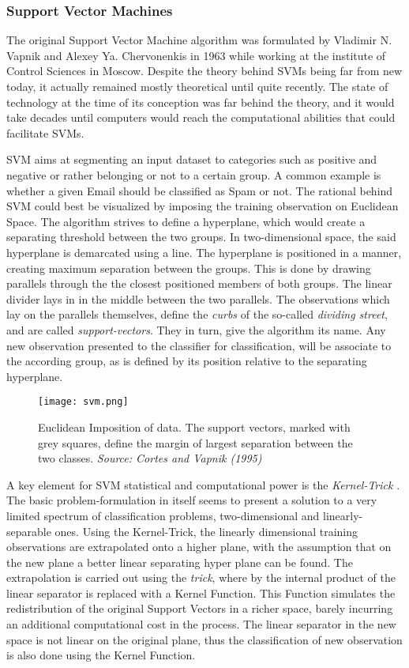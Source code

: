	\subsubsection*{Support Vector Machines}
		The original Support Vector Machine algorithm was formulated by Vladimir N. Vapnik and Alexey Ya. Chervonenkis in 1963 while working at the institute of Control Sciences in Moscow. Despite the theory behind SVMs being far from new today, it actually remained mostly theoretical until quite recently. The state of technology at the time of its conception was far behind the theory, and it would take decades until computers would reach the computational abilities that could facilitate SVMs.
		\par
		SVM aims at segmenting an input dataset to categories such as positive and negative or rather belonging or not to a certain group. A common example is whether a given Email should be classified as Spam or not. The rational behind SVM could best be visualized by imposing the training observation on Euclidean Space. The algorithm strives to define a hyperplane, which would create a separating threshold between the two groups. In two-dimensional space, the said hyperplane is demarcated using a line. The hyperplane is positioned in a manner, creating maximum separation between the groups. This is done by drawing parallels through the the closest positioned members of both groups. The linear divider lays in in the middle between the two parallels. The observations which lay on the parallels themselves, define the \textit{curbs} of the so-called \textit{dividing street}, and are called \textit{support-vectors}. They in turn, give the algorithm its name. Any new observation presented to the classifier for classification, will be associate to the according group, as is defined by its position relative to the separating hyperplane. 
		
		\begin{figure}[h]
			\centering
			\texttt{[image: svm.png]}
			\caption{Euclidean Imposition of data. The support vectors, marked with grey squares, define the margin of largest separation between the two classes. \textit{Source: Cortes and Vapnik (1995)} \cite{SVM_cortes1995support}}
		\end{figure}
		
		A key element for SVM statistical and computational power is the \textit{Kernel-Trick} \cite{guyon1993automatic}. The basic problem-formulation in itself seems to present a solution to a very limited spectrum of classification problems, two-dimensional and linearly-separable ones. Using the Kernel-Trick, the linearly dimensional training observations are extrapolated onto a higher plane, with the assumption that on the new plane a better linear separating hyper plane can be found. The extrapolation is carried out using the \textit{trick}, where by the internal product of the linear separator is replaced with a Kernel Function. This Function simulates the redistribution of the original Support Vectors in a richer space, barely incurring an additional computational cost in the process. The linear separator in the new space is not linear on the original plane, thus the classification of new observation is also done using the Kernel Function.
		
